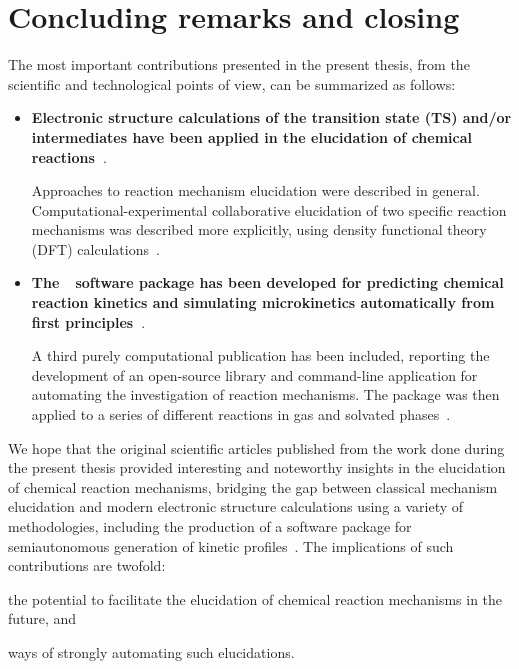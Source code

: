 \chapter{Concluding remarks and closing}%
\label{ch:conclusion}


The most important contributions presented in the present thesis,
from the scientific and technological points of view, can be summarized as follows:

\begin{itemize}
	\item \textbf{Electronic structure calculations of the transition state (TS)
		      and/or intermediates have been applied
		      in the elucidation of chemical reactions~\cite{Coelho_2019,Oliveira_2020}}.

	      Approaches to reaction mechanism elucidation were described in general.
	      \linebreak
	      Computational-experimental collaborative elucidation of two specific reaction mechanisms was described more explicitly,
	      using density functional theory (DFT) calculations~\cite{Coelho_2019,Oliveira_2020}.

	\item \textbf{The~\overreact{}~software package has been developed for predicting chemical reaction kinetics
		      and simulating microkinetics automatically from first principles~\cite{Schneider_2022}}.

	      A third purely computational publication has been included,
	      reporting the development of an open-source library
	      and command-line application for automating the investigation
	      of reaction mechanisms.
	      The package was then applied to a series of different reactions
	      in gas and solvated phases~\cite{Schneider_2022}.
\end{itemize}


We hope that the original scientific articles published from the work done
during the present thesis provided
interesting and noteworthy insights in the elucidation of chemical reaction mechanisms,
bridging the gap between classical mechanism elucidation
and modern electronic structure calculations using a variety of methodologies,
including the production of a software package for semiautonomous generation
of kinetic profiles~\cite{Schneider_2022}.
The implications of such contributions are twofold:
%
\begin{itemize*}
	\item the potential to facilitate the elucidation of chemical reaction mechanisms in the future, and
	\item ways of strongly automating such elucidations.
\end{itemize*}

